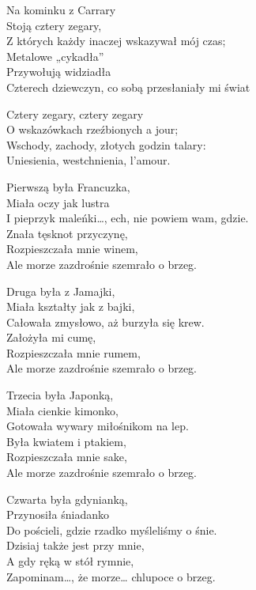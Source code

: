 \begin{text}
    Na kominku z Carrary\\
    Stoją cztery zegary,\\
    Z których każdy inaczej wskazywał mój czas;\\
    Metalowe „cykadła”\\
    Przywołują widziadła\\
    Czterech dziewczyn, co sobą przesłaniały mi świat

    \vin Cztery zegary, cztery zegary\\
    \vin O wskazówkach rzeźbionych a jour;\\
    \vin Wschody, zachody, złotych godzin talary:\\
    \vin Uniesienia, westchnienia, l’amour.

    Pierwszą była Francuzka,\\
    Miała oczy jak lustra\\
    I pieprzyk maleńki…, ech, nie powiem wam, gdzie.\\
    Znała tęsknot przyczynę,\\
    Rozpieszczała mnie winem,\\
    Ale morze zazdrośnie szemrało o brzeg.

    Druga była z Jamajki,\\
    Miała kształty jak z bajki,\\
    Całowała zmysłowo, aż burzyła się krew.\\
    Założyła mi cumę,\\
    Rozpieszczała mnie rumem,\\
    Ale morze zazdrośnie szemrało o brzeg.

    Trzecia była Japonką,\\
    Miała cienkie kimonko,\\
    Gotowała wywary miłośnikom na lep.\\
    Była kwiatem i ptakiem,\\
    Rozpieszczała mnie sake,\\
    Ale morze zazdrośnie szemrało o brzeg.

    Czwarta była gdynianką,\\
    Przynosiła śniadanko\\
    Do pościeli, gdzie rzadko myśleliśmy o śnie.\\
    Dzisiaj także jest przy mnie,\\
    A gdy ręką w stół rymnie,\\
    Zapominam…, że morze… chlupoce o brzeg.
\end{text}

